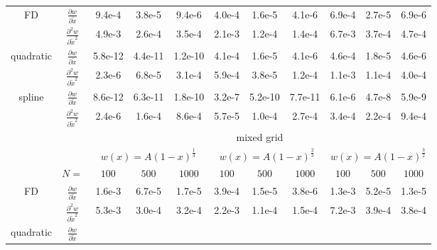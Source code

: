 \begin{tabular}{cc|c|c|c|c|c|c|c|c|c|}
\\ \cline{1-11}
\multicolumn{1}{|c|}{\multirow{2}{*}{FD}} &
\multicolumn{1}{|c|}{$\frac{\partial w}{\partial \tilde x}$}
  &9.4e-4  &3.8e-5  &9.4e-6  &4.0e-4  &1.6e-5  &4.1e-6  &6.9e-4  &2.7e-5  &6.9e-6
\\ \cline{2-11}
\multicolumn{1}{|c|}{}                        &
\multicolumn{1}{|c|}{$\frac{\partial^2 w}{\partial \tilde x^2}$}
  &4.9e-3  &2.6e-4  &3.5e-4  &2.1e-3  &1.2e-4  &1.4e-4  &6.7e-3  &3.7e-4  &4.7e-4
\\ \cline{1-11}
\multicolumn{1}{|c|}{\multirow{2}{*}{quadratic}} &
\multicolumn{1}{|c|}{$\frac{\partial w}{\partial \tilde x}$}
  &5.8e-12  &4.4e-11  &1.2e-10  &4.1e-4  &1.6e-5  &4.1e-6  &4.6e-4  &1.8e-5  &4.6e-6
\\ \cline{2-11}
\multicolumn{1}{|c|}{}                        &
\multicolumn{1}{|c|}{$\frac{\partial^2 w}{\partial \tilde x^2}$}
  &2.3e-6  &6.8e-5  &3.1e-4  &5.9e-4  &3.8e-5  &1.2e-4  &1.1e-3  &1.1e-4  &4.0e-4
\\ \cline{1-11}
\multicolumn{1}{|c|}{\multirow{2}{*}{spline}} &
\multicolumn{1}{|c|}{$\frac{\partial w}{\partial \tilde x}$}
  &8.6e-12  &6.3e-11  &1.8e-10  &3.2e-7  &5.2e-10  &7.7e-11  &6.1e-6  &4.7e-8  &5.9e-9
\\ \cline{2-11}
\multicolumn{1}{|c|}{}                        &
\multicolumn{1}{|c|}{$\frac{\partial^2 w}{\partial \tilde x^2}$}
  &2.4e-6  &1.6e-4  &8.6e-4  &5.7e-5  &1.0e-4  &2.7e-4  &3.4e-4  &2.2e-4  &9.4e-4
\\ \cline{1-11}
& & \multicolumn{9}{|c|}{mixed grid}
\\ \cline{3-11}
& & \multicolumn{3}{|c|}{$w(x)=A(1-x)^\frac{1}{3}$} &  \multicolumn{3}{|c|}{$w(x)=A(1-x)^\frac{2}{3}$} &  \multicolumn{3}{|c|}{$w(x)=A(1-x)^\frac{3}{2}$}
\\ \cline{2-11}
& \multicolumn{1}{|c|}{$N=$} & $100$ & $500$ & $1000$ & $100$ & $500$ & $1000$ & $100$ & $500$ & $1000$
\\ \cline{1-11}
\multicolumn{1}{|c|}{\multirow{2}{*}{FD}} &
\multicolumn{1}{|c|}{$\frac{\partial w}{\partial \tilde x}$}
  &1.6e-3  &6.7e-5  &1.7e-5  &3.9e-4  &1.5e-5  &3.8e-6  &1.3e-3  &5.2e-5  &1.3e-5
\\ \cline{2-11}
\multicolumn{1}{|c|}{}                        &
\multicolumn{1}{|c|}{$\frac{\partial^2 w}{\partial \tilde x^2}$}
  &5.3e-3  &3.0e-4  &3.2e-4  &2.2e-3  &1.1e-4  &1.5e-4  &7.2e-3  &3.9e-4  &3.8e-4
\\ \cline{1-11}
\multicolumn{1}{|c|}{\multirow{2}{*}{quadratic}} &
\multicolumn{1}{|c|}{$\frac{\partial w}{\partial \tilde x}$}

\end{tabular}
